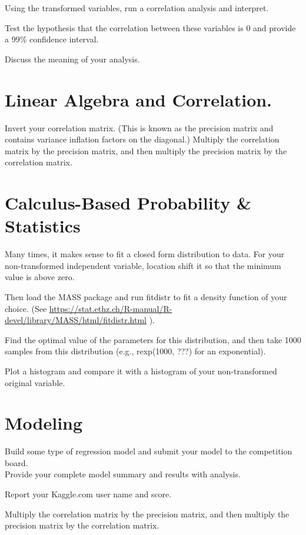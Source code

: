 \documentclass[]{article}
\begin{document}
Using the transformed variables, run a correlation analysis and
interpret.

Test the hypothesis that the correlation between these variables is 0
and provide a 99\% confidence interval.

Discuss the meaning of your analysis.

\section{Linear Algebra and
Correlation.}\label{linear-algebra-and-correlation.}

Invert your correlation matrix. (This is known as the precision matrix
and contains variance inflation factors on the diagonal.) Multiply the
correlation matrix by the precision matrix, and then multiply the
precision matrix by the correlation matrix.

\section{Calculus-Based Probability \&
Statistics}\label{calculus-based-probability-statistics}

Many times, it makes sense to fit a closed form distribution to data.
For your non-transformed independent variable, location shift it so that
the minimum value is above zero.

Then load the MASS package and run fitdistr to fit a density function of
your choice. (See
\url{https://stat.ethz.ch/R-manual/R-devel/library/MASS/html/fitdistr.html}
).

Find the optimal value of the parameters for this distribution, and then
take 1000 samples from this distribution (e.g., rexp(1000, ???) for an
exponential).

Plot a histogram and compare it with a histogram of your non-transformed
original variable.

\section{Modeling}\label{modeling}

Build some type of regression model and submit your model to the
competition board.\\
Provide your complete model summary and results with analysis.

Report your Kaggle.com user name and score.

Multiply the correlation matrix by the precision matrix, and then
multiply the precision matrix by the correlation matrix.
\end{document}
